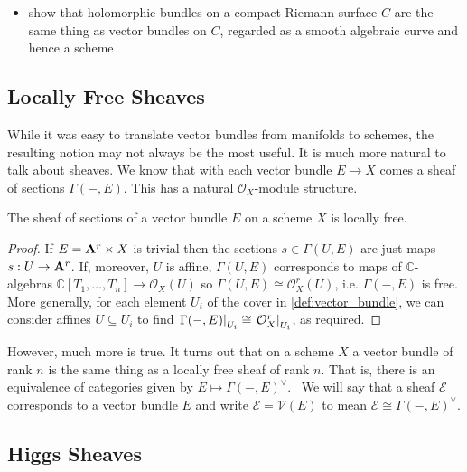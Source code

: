 \documentclass[12pt]{ociamthesis}  %
\begin{document}
\begin{itemize}
  \item show that holomorphic bundles on a compact Riemann surface $C$
    are the same thing as vector bundles on $C$, regarded as a smooth algebraic curve and hence a scheme
\end{itemize}

\missingsection

\subsection{Locally Free Sheaves}

While it was easy to translate vector bundles from manifolds
to schemes, the resulting notion may not always be the most
useful. It is much more natural to talk about sheaves. We know
that with each vector bundle $E\to X$ comes a sheaf of sections
$\Gamma(-,E)$. This has a natural $\mathcal O_X$-module structure.

\begin{lemma}
  The sheaf of sections of a vector bundle $E$ on a scheme $X$ is
  locally free.
  \begin{proof}
    If $E=\mathbf{A}^{r}_{}\times X$ is
    trivial then the sections $s\in\Gamma(U,E)$ are just maps
    $s:U\to \mathbf{A}^{r}_{}$. If, moreover, $U$ is affine,
    $\Gamma(U,E)$ corresponds to maps of
    $\mathbb{C}$-algebras
    $\mathbb{C}[T_1,\ldots,T_n]\to\mathcal O_X(U)$ so
    $\Gamma(U,E)\cong \mathcal O^r_X(U)$, i.e. $\Gamma(-,E)$
    is free.
    More generally, for each element $U_i$ of the cover in
    \ref{def:vector_bundle}, we can consider affines $U\subseteq U_i$
    to find $\left.{\Gamma(-,E)}\right\vert_{U_i}\cong \left.{\mathcal O_X^r}\right\vert_{U_i}$,
    as required.
  \end{proof}
\end{lemma}

However, much more is true. It turns out that on a scheme $X$
a vector bundle of rank $n$ is the same thing as a locally
free sheaf of rank $n$. That is, there is an equivalence
of categories given by $E \mapsto \Gamma(-,E)^\vee$.~\cite[128-129]{hartshorne1977}
We will say that a sheaf $\mathcal E$ corresponds to a vector bundle
$E$ and write $\mathcal E=\mathscr V(E)$ to mean
$\mathcal E\cong\Gamma(-,E)^\vee$.

\subsection{Higgs Sheaves}
\end{document}
